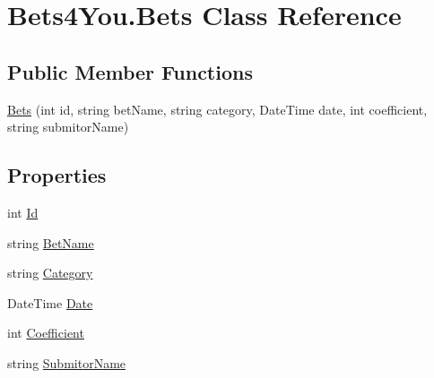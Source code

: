 \hypertarget{class_bets4_you_1_1_bets}{}\section{Bets4\+You.\+Bets Class Reference}
\label{class_bets4_you_1_1_bets}
\subsection*{Public Member Functions}
\begin{DoxyCompactItemize}
\item 
\mbox{\hyperlink{class_bets4_you_1_1_bets_a6188e75bf4e4e76f8a28fe0bbdba9b50}{Bets}} (int id, string bet\+Name, string category, Date\+Time date, int coefficient, string submitor\+Name)
\end{DoxyCompactItemize}
\subsection*{Properties}
\begin{DoxyCompactItemize}
\item 
int \mbox{\hyperlink{class_bets4_you_1_1_bets_a9a91a1308fc8efab5023a6669ccae9e0}{Id}}
\item 
string \mbox{\hyperlink{class_bets4_you_1_1_bets_ae4ef2f2f1d5e577c053aa32d6b8b51ab}{Bet\+Name}}
\item 
string \mbox{\hyperlink{class_bets4_you_1_1_bets_ad663fd35fcfb7acca1c7379c406508b4}{Category}}
\item 
Date\+Time \mbox{\hyperlink{class_bets4_you_1_1_bets_a9ef7e326f054f1b1c2da5405c2274938}{Date}}
\item 
int \mbox{\hyperlink{class_bets4_you_1_1_bets_a88ef57c45da57a60eb4dd3b33b5c972b}{Coefficient}}
\item 
string \mbox{\hyperlink{class_bets4_you_1_1_bets_a6d12e2805d6ad58f802c016e7447a8bb}{Submitor\+Name}}
\end{DoxyCompactItemize}


